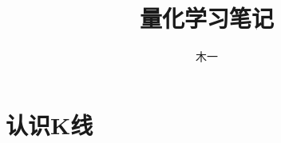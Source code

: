 \documentclass[UTF8]{article}
\title{量化学习笔记}
\author{木一}
\begin{document}
\maketitle

\section{认识K线}
\end{document}
